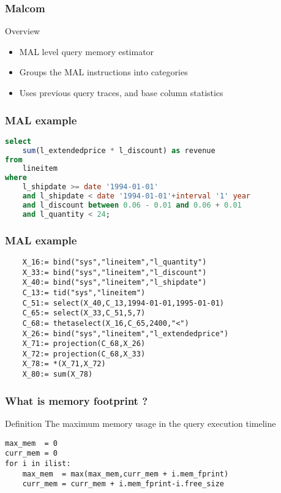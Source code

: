 \begin{frame}
\frametitle{Malcom}
\begin{block}{Overview}
\begin{itemize}
	\item MAL level query memory estimator
	\item Groups the MAL instructions into categories
	\item Uses previous query traces, and base column statistics
\end{itemize}
\end{block}
\end{frame}

\begin{frame}[fragile]
\frametitle{MAL example}
	\begin{lstlisting}[basicstyle=\ttfamily\footnotesize, language=SQL]
select
	sum(l_extendedprice * l_discount) as revenue
from
	lineitem
where
	l_shipdate >= date '1994-01-01'
	and l_shipdate < date '1994-01-01'+interval '1' year
	and l_discount between 0.06 - 0.01 and 0.06 + 0.01
	and l_quantity < 24;
	\end{lstlisting}
\end{frame}

\begin{frame}[fragile]
\frametitle{MAL example}
	\begin{lstlisting}
	X_16:= bind("sys","lineitem","l_quantity")
	X_33:= bind("sys","lineitem","l_discount")
	X_40:= bind("sys","lineitem","l_shipdate")
	C_13:= tid("sys","lineitem")
	C_51:= select(X_40,C_13,1994-01-01,1995-01-01)
	C_65:= select(X_33,C_51,5,7)
	C_68:= thetaselect(X_16,C_65,2400,"<")
	X_26:= bind("sys","lineitem","l_extendedprice")
	X_71:= projection(C_68,X_26)
	X_72:= projection(C_68,X_33)
	X_78:= *(X_71,X_72)
	X_80:= sum(X_78)
	\end{lstlisting}
\end{frame}

\begin{frame}[fragile]
\frametitle{What is memory footprint ?}
\begin{block}{Definition}
The maximum memory usage in the query execution timeline
\end{block}
\begin{lstlisting}
max_mem  = 0
curr_mem = 0
for i in ilist:
	max_mem  = max(max_mem,curr_mem + i.mem_fprint)
	curr_mem = curr_mem + i.mem_fprint-i.free_size
\end{lstlisting}
\end{frame}

